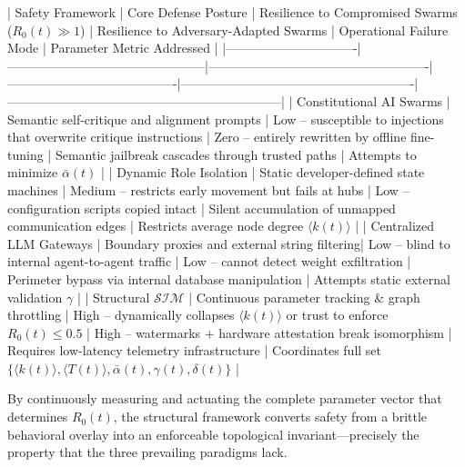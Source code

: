 | Safety Framework              | Core Defense Posture                          | Resilience to Compromised Swarms (\(R_0(t)\gg 1\)) | Resilience to Adversary-Adapted Swarms | Operational Failure Mode                              | Parameter Metric Addressed                                      |
|-------------------------------|-----------------------------------------------|----------------------------------------------------|----------------------------------------|-------------------------------------------------------|-----------------------------------------------------------------|
| Constitutional AI Swarms      | Semantic self-critique and alignment prompts  | Low – susceptible to injections that overwrite critique instructions | Zero – entirely rewritten by offline fine-tuning | Semantic jailbreak cascades through trusted paths    | Attempts to minimize \(\bar{\alpha}(t)\)                        |
| Dynamic Role Isolation        | Static developer-defined state machines       | Medium – restricts early movement but fails at hubs | Low – configuration scripts copied intact | Silent accumulation of unmapped communication edges  | Restricts average node degree \(\langle k(t)\rangle\)           |
| Centralized LLM Gateways      | Boundary proxies and external string filtering| Low – blind to internal agent-to-agent traffic     | Low – cannot detect weight exfiltration | Perimeter bypass via internal database manipulation  | Attempts static external validation \(\gamma\)                  |
| Structural \(\mathcal{S}\mathcal{I}\mathcal{M}\) | Continuous parameter tracking & graph throttling | High – dynamically collapses \(\langle k(t)\rangle\) or trust to enforce \(R_0(t)\le 0.5\) | High – watermarks + hardware attestation break isomorphism | Requires low-latency telemetry infrastructure        | Coordinates full set \(\{\langle k(t)\rangle,\langle T(t)\rangle,\bar{\alpha}(t),\gamma(t),\delta(t)\}\) |

By continuously measuring and actuating the complete parameter vector that determines \(R_0(t)\), the structural framework converts safety from a brittle behavioral overlay into an enforceable topological invariant—precisely the property that the three prevailing paradigms lack.
